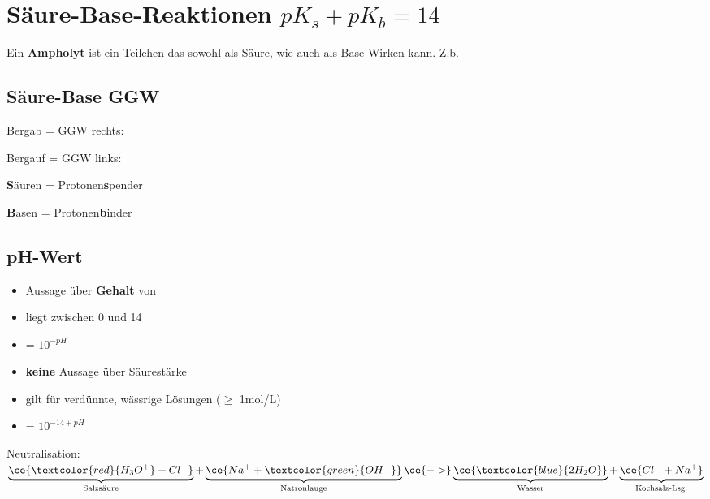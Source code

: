 \section{Säure-Base-Reaktionen $pK_{s}+ pK_{b} = 14$}
Ein \textbf{Ampholyt} ist ein Teilchen das sowohl als Säure, wie auch als Base Wirken kann. 
Z.b. 
\subsection{Säure-Base GGW}
    \begin{minipage}{0.65\columnwidth}
        Bergab = GGW rechts: 

        Bergauf = GGW links: 
    \end{minipage}
    \hfill
    \begin{minipage}{0.33\columnwidth}
        \textbf{S}äuren = Protonen\textbf{s}pender

        \textbf{B}asen = Protonen\textbf{b}inder
    \end{minipage}

\subsection{pH-Wert}
    \begin{minipage}{0.4\columnwidth}
        \begin{itemize}
            \item Aussage über \textbf{Gehalt} von 
            \item liegt zwischen 0 und 14
            \item \ce{[H3O+]} = $10^{-pH}$
        \end{itemize}
    \end{minipage}
    \hfill
    \begin{minipage}{0.59\columnwidth}
        \begin{itemize}
            \item \textbf{keine} Aussage über Säurestärke
            \item gilt für verdünnte, wässrige Lösungen ($\geq$ 1mol/L)
            \item \ce{[OH^-]} = $10^{-14+pH}$
        \end{itemize}
    \end{minipage}
    
    Neutralisation: $\underbrace{\ce{\textcolor{red}{H_3O^+} + {Cl^-}}}_{\text{Salzsäure}} + \underbrace{\ce{{Na^+} + \textcolor{green}{OH^-}}}_{\text{Natronlauge}} \ce{->} \underbrace{\ce{\textcolor{blue}{2 H_2O}}}_{\text{Wasser}} + \underbrace{\ce{{Cl^-} + {Na^+}}}_{\text{Kochsalz-Lsg.}}$

